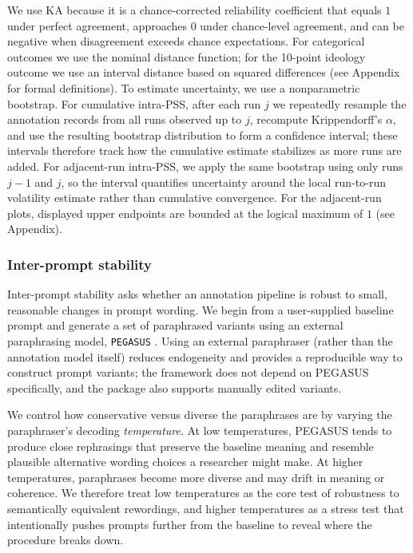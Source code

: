 \documentclass{article}
\begin{document}
We use KA because it is a chance-corrected reliability coefficient that equals $1$ under perfect agreement, approaches $0$ under chance-level agreement, and can be negative when disagreement exceeds chance expectations. For categorical outcomes we use the nominal distance function; for the 10-point ideology outcome we use an interval distance based on squared differences (see Appendix for formal definitions). To estimate uncertainty, we use a nonparametric bootstrap. For cumulative intra-PSS, after each run $j$ we repeatedly resample the annotation records from all runs observed up to $j$, recompute Krippendorff's $\alpha$, and use the resulting bootstrap distribution to form a confidence interval; these intervals therefore track how the cumulative estimate stabilizes as more runs are added. For adjacent-run intra-PSS, we apply the same bootstrap using only runs $j-1$ and $j$, so the interval quantifies uncertainty around the local run-to-run volatility estimate rather than cumulative convergence. For the adjacent-run plots, displayed upper endpoints are bounded at the logical maximum of $1$ (see Appendix).

\subsubsection{Inter-prompt stability}

Inter-prompt stability asks whether an annotation pipeline is robust to small, reasonable changes in prompt wording. We begin from a user-supplied baseline prompt and generate a set of paraphrased variants using an external paraphrasing model, \texttt{PEGASUS} \citep{zhang2019pegasus}. Using an external paraphraser (rather than the annotation model itself) reduces endogeneity and provides a reproducible way to construct prompt variants; the framework does not depend on PEGASUS specifically, and the package also supports manually edited variants.

We control how conservative versus diverse the paraphrases are by varying the paraphraser's decoding \emph{temperature}. At low temperatures, PEGASUS tends to produce close rephrasings that preserve the baseline meaning and resemble plausible alternative wording choices a researcher might make. At higher temperatures, paraphrases become more diverse and may drift in meaning or coherence. We therefore treat low temperatures as the core test of robustness to semantically equivalent rewordings, and higher temperatures as a stress test that intentionally pushes prompts further from the baseline to reveal where the procedure breaks down.
\end{document}
